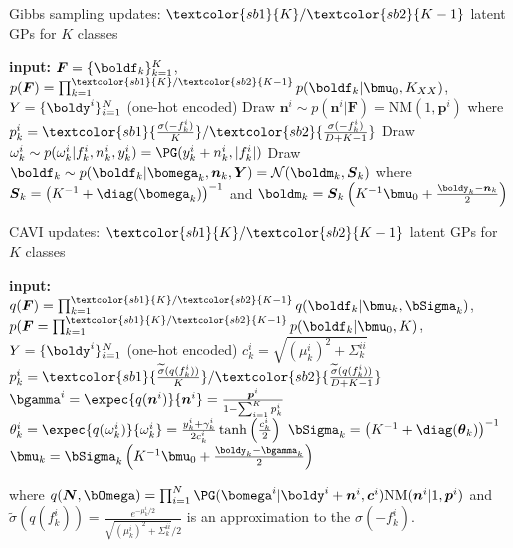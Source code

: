 \begin{algorithm}[H]
    \caption{Gibbs sampling updates: $\textcolor{sb1}{K}/\textcolor{sb2}{K - 1}$ latent \ac{GPs} for $K$ classes}
    \begin{algorithmic}
    \State \textbf{input:} $\boldsymbol{F} = \{\boldf_k\}_{k=1}^K$, $p(\boldsymbol{F}) = \prod_{k=1}^{\textcolor{sb1}{K}/\textcolor{sb2}{K - 1}} p(\boldf_k|\bmu_0, K_{XX})$, $Y=\{\boldy^i\}_{i=1}^N$ (one-hot encoded)
        \State Draw $\boldsymbol{n}^i \sim p(\boldsymbol{n}^i|\boldsymbol{F}) = \mathrm{NM}(1, \boldsymbol{p}^i)$ where 
        $p_k^i = \textcolor{sb1}{\frac{\sigma(-f_k^i)}{K}}/\textcolor{sb2}{\frac{\sigma(-f_k^i)}{D + K - 1}}$
        \State Draw $\omega_k^i \sim p(\omega_k^i|f_k^i, n_k^i, y_k^i) = \PG(y_k^i + n^i_k, |f_k^i|)$
        \State Draw $\boldf_k \sim p(\boldf_k|\bomega_k,\boldsymbol{n}_k, \boldsymbol{Y}) = \mathcal{N}(\boldm_k, \boldsymbol{S}_k)$
        \State where $\boldsymbol{S}_k = \left(K^{-1} + \diag(\bomega_k)\right)^{-1}$ and $\boldm_k = \boldsymbol{S}_k\left(K^{-1}\bmu_0 + \frac{\boldy_k - \boldsymbol{n}_k}{2}\right)$
    \EndFor
    \end{algorithmic}
    \label{alg:gibbs_multiclass}
\end{algorithm}

\begin{algorithm}[H]
    \caption{\ac{CAVI} updates: $\textcolor{sb1}{K}/\textcolor{sb2}{K - 1}$ latent \ac{GPs} for $K$ classes}
    \begin{algorithmic}
    \State \textbf{input:} $q(\boldsymbol{F}) = \prod_{k=1}^{\textcolor{sb1}{K}/\textcolor{sb2}{K - 1}} q(\boldf_k|\bmu_k, \bSigma_k)$, $p(\boldsymbol{F} = \prod_{k=1}^{\textcolor{sb1}{K}/\textcolor{sb2}{K - 1}} p(\boldf_k|\bmu_0, K)$, $Y=\{\boldy^i\}_{i=1}^N$ (one-hot encoded)
        \State $c^i_k = \sqrt{(\mu^i_k)^2 + \Sigma_k^{ii}}$
        \State $p^i_k = \textcolor{sb1}{\frac{\widetilde{\sigma}(q(f_k^i))}{K}}/\textcolor{sb2}{\frac{\widetilde{\sigma}(q(f_k^i))}{D + K - 1}}$
        \State $\bgamma^i = \expec{q(\boldsymbol{n}^i)}{\boldsymbol{n}^i} = \frac{\boldsymbol{p}^i}{1 - \sum_{i=1}^K p^i_k}$
        \State $\theta_k^i = \expec{q(\omega_k^i)}{\omega_k^i} = \frac{y_k^i + \gamma_k^i}{2c_k^i}\tanh\left(\frac{c_k^i}{2}\right)$
        \State $\bSigma_k = \left(K^{-1} + \diag(\boldsymbol{\theta}_k)\right)^{-1}$
        \State $\bmu_k = \bSigma_k\left(K^{-1}\bmu_0 + \frac{\boldy_k - \bgamma_k}{2}\right)$
    \EndWhile
    \end{algorithmic}
    where $q(\boldsymbol{N}, \bOmega) = \prod_{i=1}^N \PG(\bomega^i|\boldy^i + \boldsymbol{n}^i, \boldsymbol{c}^i)\mathrm{NM}(\boldsymbol{n}^i|1, \boldsymbol{p}^i)$ and $\widetilde{\sigma}(q(f_k^i)) = \frac{e^{-\mu_k^i/2}}{\sqrt{(\mu_k^i)^2 + \Sigma^{ii}_k} / 2}$ is an approximation to the $\sigma(-f^i_k)$.
    \label{alg:cavi_multiclass}
\end{algorithm}

